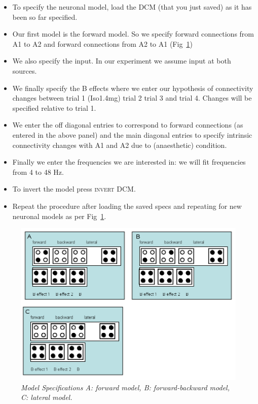 \begin{itemize}
\item To specify the neuronal model, load the DCM (that you just saved) as it has been so far specified.
\item Our first model is the forward model. So we specify forward connections from A1 to A2 and forward connections from A2 to A1 (Fig~\ref{dcm_ssr:fig2})
\item We also specify the input. In our experiment we assume input at both sources.
\item We finally specify the B effects where we enter our hypothesis of connectivity changes between trial 1 (Iso1.4mg) trial 2 trial 3 and trial 4. Changes will be specified relative to trial 1.
\item We enter the off diagonal entries to correspond to forward connections (as entered in the above panel) and the main diagonal entries to specify intrinsic connectivity changes with A1 and A2 due to (anaesthetic) condition.
\item Finally we enter the frequencies we are interested in: we will fit frequencies from 4 to 48 Hz.
\item To invert the model press \textsc{invert DCM}.
\item Repeat the procedure after loading the saved specs and repeating for new neuronal models as per Fig~\ref{dcm_ssr:fig2}.
\end{itemize}

\begin{figure}
\begin{center}
\includegraphics[width=140mm]{dcm_ssr/fig2}
\caption{\em Model Specifications A: forward model, B: forward-backward model, C: lateral model. \label{dcm_ssr:fig2}}
\end{center}
\end{figure}

